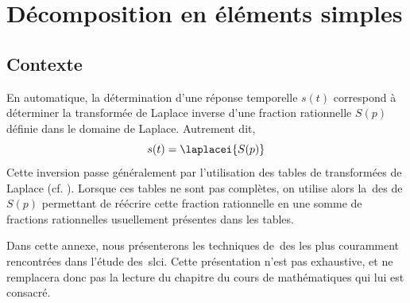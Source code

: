 \chapter{Décomposition en éléments simples\label{annexe-DES}}

\section{Contexte}
En automatique, la détermination d'une réponse temporelle $s(t)$
correspond à déterminer la transformée 
de Laplace inverse d'une fraction rationnelle $S(p)$ 
définie dans le domaine de Laplace. Autrement dit, 
\[
s(t)=\laplacei{S(p)}
\]
Cette inversion passe généralement par l'utilisation des tables de 
transformées de Laplace (cf. ).
Lorsque ces tables ne sont pas complètes, on utilise alors 
la~\gls{des} de $S(p)$ permettant de réécrire cette fraction 
rationnelle en une somme de fractions rationnelles 
usuellement présentes dans les tables.

Dans cette annexe, nous présenterons les techniques de~\gls{des} les plus 
couramment rencontrées dans l'étude des~\gls{slci}. 
Cette présentation n'est pas exhaustive, et ne remplacera donc 
pas la lecture du chapitre du cours de mathématiques qui lui est consacré.

